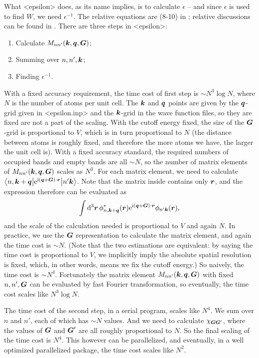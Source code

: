 \documentclass[hyperref, a4paper, 12pt]{report}
\newcommand*{\ii}{\mathrm{i}}
\newcommand*{\ee}{\mathrm{e}}
\def\texttt#1{<#1>}%
\newcommand{\shortcode}[1]{\texttt{#1}}
\begin{document}
What \shortcode{epsilon} does, 
as its name implies, is to calculate $\epsilon$ --
and since $\epsilon$ is used to find $W$,
we need $\epsilon^{-1}$.
The relative equations are (8-10) in \cite{berkeleygw};
relative discussions can be found in .
There are three steps in \shortcode{epsilon}:
\begin{enumerate}
    \item Calculate $M_{nn'}(\vb*{k}, \vb*{q}, \vb*{G})$;
    \item Summing over $n, n', \vb*{k}$;
    \item Finding $\epsilon^{-1}$.
\end{enumerate}

With a fixed accuracy requirement,
the time cost of first step is $\sim N^3 \log N$,
where $N$ is the number of atoms per unit cell.
The $\vb*{k}$ and $\vb*{q}$ points are given 
by the $\vb*{q}$-grid given in \shortcode{epsilon.inp}
and the $\vb*{k}$-grid in the wave function files,
so they are fixed are not a part of the scaling.
With the cutoff energy fixed,
the size of the $\vb*{G}$-grid is proportional to $V$,
which is in turn proportional to $N$
(the distance between atoms is roughly fixed,
and therefore the more atoms we have,
the larger the unit cell is).
With a fixed accuracy standard,
the required numbers of occupied bands and empty bands 
are all $\sim N$,
so the number of matrix elements of $M_{nn'}(\vb*{k}, \vb*{q}, \vb*{G})$ scales as $N^3$.
For each matrix element, 
we need to calculate 
$\mel**{n, \vb*{k} + \vb*{q}}{\ee^{\ii (\vb*{q} + \vb*{G}) \cdot \vb*{r} }}{n' \vb*{k}}$.
Note that the matrix inside contains only $\vb*{r}$,
and the expression therefore can be evaluated as 
\[
    \int \dd[3]{\vb*{r}} \phi_{n, \vb*{k} + \vb*{q}}^*(\vb*{r}) 
    \ee^{\ii (\vb*{q} + \vb*{G}) \cdot \vb*{r}}
    \phi_{n' \vb*{k}}(\vb*{r}),
\]
and the scale of the calculation needed is proportional to $V$
and again $N$.
In practice, we use the $\vb*{G}$ representation to calculate the matrix element,
and again the time cost is $\sim N$.
(Note that the two estimations are equivalent: 
by saying the time cost is proportional to $V$,
we implicitly imply the absolute spatial resolution is fixed,
which, in other words, means we fix the cutoff energy.)
So naively, the time cost is $\sim N^4$.
Fortunately the matrix element $M_{nn'}(\vb*{k}, \vb*{q}, \vb*{G})$
with fixed $n, n', \vb*{G}$ 
can be evaluated by fast Fourier transformation,
so eventually, the time cost scales like $N^3 \log N$.

The time cost of the second step, 
in a serial program, scales like $N^4$.
We sum over $n$ and $n'$,
each of which has $\sim N$ values.
And we need to calculate $\chi_{\vb*{G} \vb*{G}'}$,
where the values of $\vb*{G}$ and $\vb*{G}'$ are all roughly proportional to $N$.
So the final scaling of the time cost is $N^4$.
This however can be parallelized,
and eventually, in a well optimized parallelized package,
the time cost scales like $N^2$.
\end{document}
